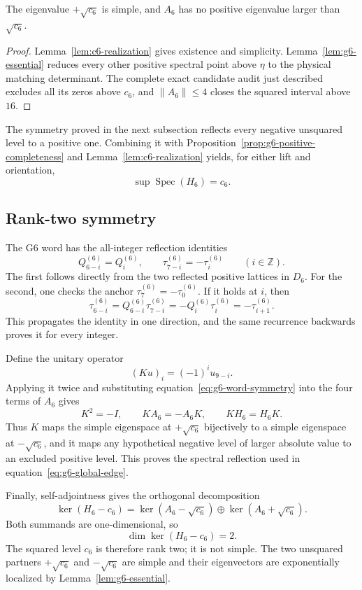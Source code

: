 \begin{proposition}
\label{prop:g6-positive-completeness}
The eigenvalue \(+\sqrt{c_6}\) is simple, and \(A_6\) has no positive
eigenvalue larger than \(\sqrt{c_6}\).
\end{proposition}

\begin{proof}
Lemma~\ref{lem:c6-realization} gives existence and simplicity.
Lemma~\ref{lem:g6-essential} reduces every other positive spectral point
above \(\eta\) to the physical matching determinant.  The complete exact
candidate audit just described excludes all its zeros above \(c_6\), and
\(\|A_6\|\leq4\) closes the squared interval above \(16\).
\end{proof}

The symmetry proved in the next subsection reflects every negative
unsquared level to a positive one.  Combining it with
Proposition~\ref{prop:g6-positive-completeness} and
Lemma~\ref{lem:c6-realization} yields, for either lift and orientation,
\begin{equation}\label{eq:g6-global-edge}
\sup\operatorname{Spec}(H_6)=c_6.
\end{equation}

\subsection{Rank-two symmetry}
\label{subsec:rank-two-symmetry}

The G6 word has the all-integer reflection identities
\begin{equation}\label{eq:g6-word-symmetry}
Q_{6-i}^{(6)}=Q_i^{(6)},\qquad
\tau_{7-i}^{(6)}=-\tau_i^{(6)}
\qquad(i\in\mathbb Z).
\end{equation}
The first follows directly from the two reflected positive lattices in
\(D_6\).  For the second, one checks the anchor
\(\tau_7^{(6)}=-\tau_0^{(6)}\).  If it holds at \(i\), then
\[
\tau_{6-i}^{(6)}
=Q_{6-i}^{(6)}\tau_{7-i}^{(6)}
=-Q_i^{(6)}\tau_i^{(6)}
=-\tau_{i+1}^{(6)}.
\]
This propagates the identity in one direction, and the same recurrence
backwards proves it for every integer.

Define the unitary operator
\[
(Ku)_i=(-1)^iu_{9-i}.
\]
Applying it twice and substituting
equation~\eqref{eq:g6-word-symmetry} into the four terms of \(A_6\) gives
\[
K^2=-I,\qquad KA_6=-A_6K,\qquad KH_6=H_6K.
\]
Thus \(K\) maps the simple eigenspace at \(+\sqrt{c_6}\) bijectively to a
simple eigenspace at \(-\sqrt{c_6}\), and it maps any hypothetical negative
level of larger absolute value to an excluded positive level.  This proves
the spectral reflection used in equation~\eqref{eq:g6-global-edge}.

Finally, self-adjointness gives the orthogonal decomposition
\[
\ker(H_6-c_6)
=\ker(A_6-\sqrt{c_6})\oplus\ker(A_6+\sqrt{c_6}).
\]
Both summands are one-dimensional, so
\[
\dim\ker(H_6-c_6)=2.
\]
The squared level \(c_6\) is therefore rank two; it is not simple.  The two
unsquared partners \(+\sqrt{c_6}\) and \(-\sqrt{c_6}\) are simple and their
eigenvectors are exponentially localized by Lemma~\ref{lem:g6-essential}.
